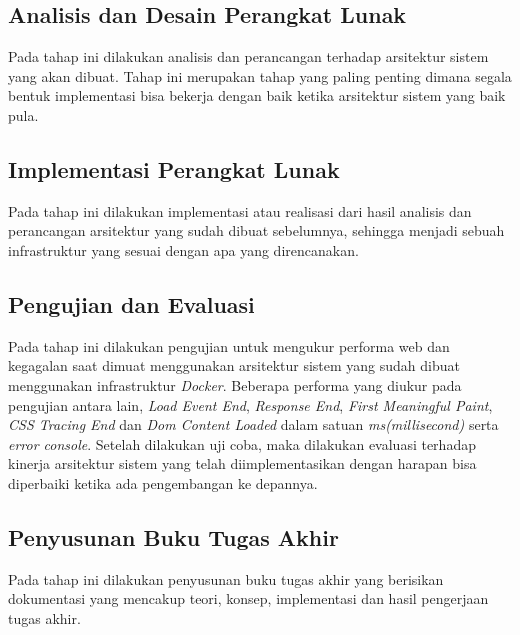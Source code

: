 		\subsection{Analisis dan Desain Perangkat Lunak}
			Pada tahap ini dilakukan analisis dan perancangan terhadap arsitektur sistem yang akan dibuat. Tahap ini merupakan tahap yang paling penting dimana segala bentuk implementasi bisa bekerja dengan baik ketika arsitektur sistem yang baik pula.
		\subsection{Implementasi Perangkat Lunak}
			Pada tahap ini dilakukan implementasi atau realisasi dari hasil analisis dan perancangan arsitektur yang sudah dibuat sebelumnya, sehingga menjadi sebuah infrastruktur yang sesuai dengan apa yang direncanakan. 
		\subsection{Pengujian dan Evaluasi}
			Pada tahap ini dilakukan pengujian untuk mengukur performa web dan kegagalan saat dimuat menggunakan arsitektur sistem yang sudah dibuat menggunakan infrastruktur \textit{Docker}. Beberapa performa yang diukur pada pengujian antara lain, \textit{Load Event End}, \textit{Response End}, \textit{First Meaningful Paint}, \textit{CSS Tracing End} dan \textit{Dom Content Loaded} dalam satuan \textit{ms(millisecond)} serta \textit{error console}. Setelah dilakukan uji coba, maka dilakukan evaluasi terhadap kinerja arsitektur sistem yang telah diimplementasikan dengan harapan bisa diperbaiki ketika ada pengembangan ke depannya.
		\subsection{Penyusunan Buku Tugas Akhir}
			Pada tahap ini dilakukan penyusunan buku tugas akhir yang berisikan dokumentasi yang mencakup teori, konsep, implementasi dan hasil pengerjaan tugas akhir.
	
